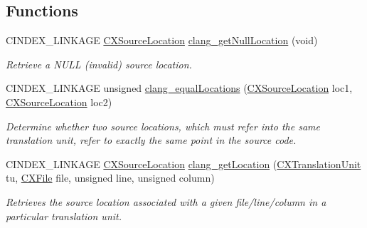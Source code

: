 \subsection*{Functions}
\begin{DoxyCompactItemize}
\item 
\mbox{\label{group__CINDEX__LOCATIONS_ga79db06b88e567b1da41620fd96c51787}} 
C\+I\+N\+D\+E\+X\+\_\+\+L\+I\+N\+K\+A\+GE \mbox{\hyperlink{structCXSourceLocation}{C\+X\+Source\+Location}} \mbox{\hyperlink{group__CINDEX__LOCATIONS_ga79db06b88e567b1da41620fd96c51787}{clang\+\_\+get\+Null\+Location}} (void)
\begin{DoxyCompactList}\small\item\em Retrieve a N\+U\+LL (invalid) source location. \end{DoxyCompactList}\item 
C\+I\+N\+D\+E\+X\+\_\+\+L\+I\+N\+K\+A\+GE unsigned \mbox{\hyperlink{group__CINDEX__LOCATIONS_gabb1ee8108ded5d3eafa6d059eb473ef8}{clang\+\_\+equal\+Locations}} (\mbox{\hyperlink{structCXSourceLocation}{C\+X\+Source\+Location}} loc1, \mbox{\hyperlink{structCXSourceLocation}{C\+X\+Source\+Location}} loc2)
\begin{DoxyCompactList}\small\item\em Determine whether two source locations, which must refer into the same translation unit, refer to exactly the same point in the source code. \end{DoxyCompactList}\item 
\mbox{\label{group__CINDEX__LOCATIONS_ga86d822034407d60d9e1f36e07cbc0f67}} 
C\+I\+N\+D\+E\+X\+\_\+\+L\+I\+N\+K\+A\+GE \mbox{\hyperlink{structCXSourceLocation}{C\+X\+Source\+Location}} \mbox{\hyperlink{group__CINDEX__LOCATIONS_ga86d822034407d60d9e1f36e07cbc0f67}{clang\+\_\+get\+Location}} (\mbox{\hyperlink{group__CINDEX_gacdb7815736ca709ce9a5e1ec2b7e16ac}{C\+X\+Translation\+Unit}} tu, \mbox{\hyperlink{group__CINDEX__FILES_gacfcea9c1239c916597e2e5b3e109215a}{C\+X\+File}} file, unsigned line, unsigned column)
\begin{DoxyCompactList}\small\item\em Retrieves the source location associated with a given file/line/column in a particular translation unit. \end{DoxyCompactList}\item 
\mbox{\label{group__CINDEX__LOCATIONS_gab6f5b1cc0761131ccfd1dc8cdca1f6d8}} 

\end{DoxyCompactItemize}
